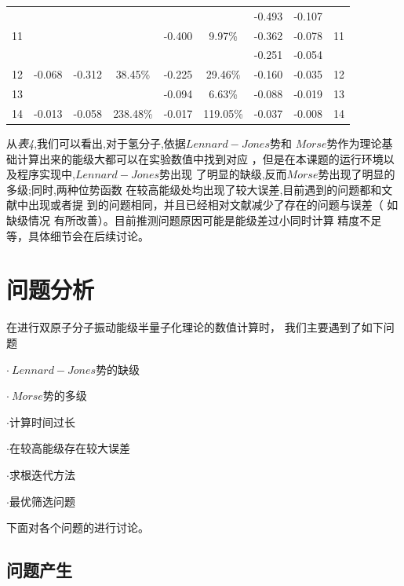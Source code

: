 \documentclass[11pt, a4paper, oneside]{ctexart}
\begin{document}
{{{{{\begin{table}[!h]
\begin{tabular}{@{}c|c|c|c|c|c|c|c|c@{}}
        &         &         &          &                        &          & -0.493 & -0.107 &    \\
    11  &         &         &          & -0.400                 & 9.97\%   & -0.362 & -0.078 & 11 \\
        &         &         &          &                        &          & -0.251 & -0.054 &    \\
    12  & -0.068  & -0.312  & 38.45\%  & -0.225                 & 29.46\%  & -0.160 & -0.035 & 12 \\
    13  &         &         &          & -0.094                 & 6.63\%   & -0.088 & -0.019 & 13 \\
    14  & -0.013  & -0.058  & 238.48\% & -0.017                 & 119.05\% & -0.037 & -0.008 & 14 \\ \bottomrule
    \end{tabular}
    \end{table}
    }


    \vspace{3mm}
   从\emph{表4},我们可以看出,对于氢分子,依据$ Lennard-Jones$势和
   $Morse$势作为理论基础计算出来的能级大都可以在实验数值中找到对应
   ，但是在本课题的运行环境以及程序实现中,$ Lennard-Jones$势出现
   了明显的缺级,反而$Morse$势出现了明显的多级;同时,两种位势函数
   在较高能级处均出现了较大误差,目前遇到的问题都和文献中出现或者提
   到的问题相同，并且已经相对文献减少了存在的问题与误差（
   如缺级情况
   有所改善）。目前推测问题原因可能是能级差过小同时计算
   精度不足等，具体细节会在后续讨论。
        
}

\newpage
\section{问题分析}
{
    在进行双原子分子振动能级半量子化理论的数值计算时，
    我们主要遇到了如下问题
    
    $\cdot$$\ Lennard-Jones$势的缺级

    $\cdot$$\ Morse$势的多级

    $\cdot$计算时间过长

    $\cdot$在较高能级存在较大误差

    $\cdot$求根迭代方法

    $\cdot$最优筛选问题
    
    
    下面对各个问题的进行讨论。
}
\subsection{问题产生}
{


}}}}
\end{document}
